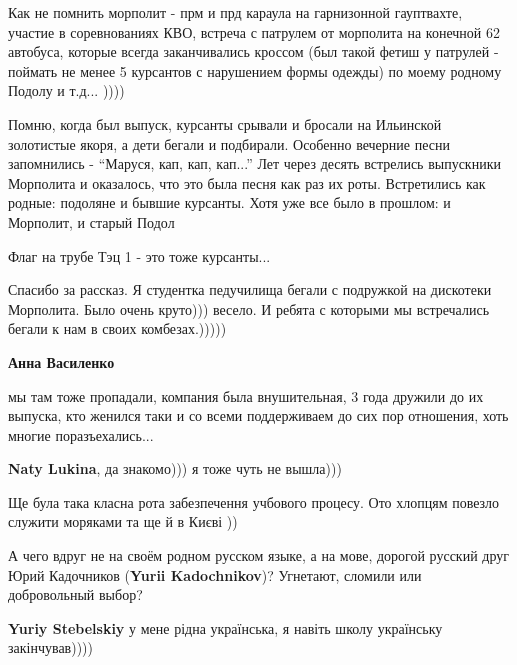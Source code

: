 \begin{itemize}

Как не помнить морполит - прм и прд караула на гарнизонной гауптвахте, участие
в соревнованиях КВО, встреча с патрулем от морполита на конечной 62 автобуса,
которые всегда заканчивались кроссом (был такой фетиш у патрулей - поймать не
менее 5 курсантов с нарушением формы одежды) по моему родному Подолу и т.д...
))))



Помню, когда был выпуск, курсанты срывали и бросали на Ильинской золотистые
якоря, а дети бегали и подбирали. Особенно вечерние песни запомнились -
\enquote{Маруся, кап, кап, кап...} Лет через десять встрелись выпускники Морполита и
оказалось, что это была песня как раз их роты. Встретились как родные: подоляне
и бывшие курсанты. Хотя уже все было в прошлом: и Морполит, и старый Подол


Флаг на трубе Тэц 1 - это тоже курсанты...


Спасибо за рассказ. Я студентка педучилища бегали с подружкой на дискотеки
Морполита. Было очень круто))) весело. И ребята с которыми мы встречались
бегали к нам в своих комбезах.)))))

\begin{itemize} %
\textbf{Анна Василенко} 

мы там тоже пропадали, компания была внушительная, 3 года дружили до их
выпуска, кто женился таки и со всеми поддерживаем до сих пор отношения, хоть
многие поразъехались...

\textbf{Naty Lukina}, да знакомо))) я тоже чуть не вышла)))
\end{itemize} %


Ще була така класна рота забезпечення учбового процесу. Ото хлопцям повезло
служити моряками та ще й в Києві ))

\begin{itemize} %

А чего вдруг не на своём родном русском языке, а на мове, дорогой русский друг
Юрий Кадочников (\textbf{Yurii Kadochnikov})? Угнетают, сломили или добровольный выбор?

\begin{itemize} %
\textbf{Yuriy Stebelskiy} у мене рідна українська, я навіть школу українську закінчував))))


\end{itemize}
\end{itemize}
\end{itemize}
